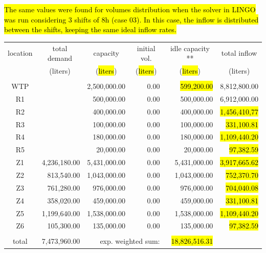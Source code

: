 \documentclass{singlecol}
\theoremstyle{TH}{
\newtheorem{lemma}{Lemma}
\newtheorem{theorem}[lemma]{Theorem}
\newtheorem{corrolary}[lemma]{Corrolary}
\newtheorem{conjecture}[lemma]{Conjecture}
\newtheorem{proposition}[lemma]{Proposition}
\newtheorem{claim}[lemma]{Claim}
\newtheorem{stheorem}[lemma]{Wrong Theorem}
\newtheorem{algorithm}{Algorithm}
}
\theoremstyle{THrm}{
\newtheorem{definition}{Definition}[section]
\newtheorem{question}{Question}[section]
\newtheorem{remark}{Remark}
\newtheorem{scheme}{Scheme}
}
\theoremstyle{THhit}{
\newtheorem{case}{Case}[section]
}
\begin{document}
\hl{The same values were found for volumes distribution when the solver in LINGO was run considering 3 shifts of 8h (case 03). In this case, the inflow is distributed between the shifts, keeping the same ideal inflow rates.}

\begin{table}[h!]
\begin{center}
\begin{small}
	\begin{tabular}{ c r r r r r } 
		location & \multicolumn{1}{c}{total demand}      & \multicolumn{1}{c}{capacity} & \multicolumn{1}{c}{initial vol.} & \multicolumn{1}{c}{idle capacity **} & \multicolumn{1}{c}{total inflow}  \\
		      & \multicolumn{1}{c}{(liters)} & \multicolumn{1}{c}{(\hl{liters})}   & \multicolumn{1}{c}{(\hl{liters})}     &  \multicolumn{1}{c}{(\hl{liters})}   &  \multicolumn{1}{c}{(liters)}               \\
		\\
		WTP   &              & 2,500,000.00 & 0.00 &  \hl{599,200.00} & 8,812,800.00 \\
		R1    &              &   500,000.00 & 0.00 &    500,000.00 & 6,912,000.00 \\
		R2    &              &   400,000.00 & 0.00 &    400,000.00 & \hl{1,456,410,77} \\
		R3    &              &   100,000.00 & 0.00 &    100,000.00 &   \hl{331,100.81} \\
	    R4    &              &   180,000.00 & 0.00 &    180,000.00 & \hl{1,109,440.20} \\
	    R5    &              &    20,000.00 & 0.00 &     20,000.00 &    \hl{97,382.59} \\
	    Z1    & 4,236,180.00 & 5,431,000.00 & 0.00 &  5,431,000.00 & \hl{3,917,665.62} \\
	    Z2    &   813,540.00 & 1,043,000.00 & 0.00 &  1,043,000.00 &   \hl{752,370.70} \\
	    Z3    &   761,280.00 &   976,000.00 & 0.00 &    976,000.00 &   \hl{704,040.08} \\
	    Z4    &   358,020.00 &   459,000.00 & 0.00 &    459,000.00 &   \hl{331,100.81} \\
	    Z5    & 1,199,640.00 & 1,538,000.00 & 0.00 &  1,538,000.00 & \hl{1,109,440.20} \\
	    Z6    &   105,300.00 &   135,000.00 & 0.00 &    135,000.00 &    \hl{97,382.59} \\
	    \\
	    total & 7,473,960.00 & \multicolumn{2}{r}{exp. weighted sum:} & \hl{18,826,516.31} &              \\

\end{tabular}
\end{small}
\end{center}
\end{table}
\end{document}
